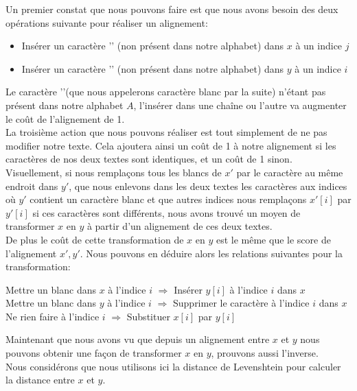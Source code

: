 \documentclass{article}
\begin{document}
Un premier constat que nous pouvons faire est que nous avons besoin des deux
opérations suivante pour réaliser un alignement:
\begin{itemize}
	\item Insérer un caractère '\textvisiblespace' (non présent dans notre
		alphabet) dans $x$ à un indice $j$
	\item Insérer un caractère '\textvisiblespace' (non présent dans notre
		alphabet) dans $y$ à un indice $i$
\end{itemize}

Le caractère '\textvisiblespace'(que nous appelerons caractère blanc par la
suite) n'étant pas présent dans notre alphabet $A$, l'insérer dans une chaîne
ou l'autre va augmenter le coût de l'alignement de 1.\\

La troisième action que nous pouvons réaliser est tout simplement de ne pas
modifier notre texte. Cela ajoutera ainsi un coût de 1 à notre alignement si
les caractères de nos deux textes sont identiques, et un coût de 1 sinon.\\

Visuellement, si nous remplaçons tous les blancs de $x'$ par le caractère au
même endroit dans $y'$, que nous enlevons dans les deux textes les caractères
aux indices où $y'$ contient un caractère blanc et que autres indices nous
remplaçons $x'[i]$ par $y'[i]$ si ces caractères sont différents, nous avons
trouvé un moyen de transformer $x$ en $y$ à partir d'un alignement de ces deux
textes.\\
De plus le coût de cette transformation de $x$ en $y$ est le même que le score de
l'alignement $x', y'$.
Nous pouvons en déduire alors les relations suivantes pour la transformation:

\begin{center}
	Mettre un blanc dans $x$ à l'indice $i$ $\Rightarrow$ Insérer $y[i]$ à
	l'indice $i$ dans $x$ \\
	Mettre un blanc dans $y$ à l'indice $i$ $\Rightarrow$ Supprimer le
	caractère à l'indice $i$ dans $x$ \\
	Ne rien faire à l'indice $i$ $\Rightarrow$ Substituer $x[i]$ par $y[i]$
\end{center}

Maintenant que nous avons vu que depuis un alignement entre $x$ et $y$ nous pouvons
obtenir une façon de transformer $x$ en $y$, prouvons aussi l'inverse.\\

Nous considérons que nous utilisons ici la distance de Levenshtein pour
calculer la distance entre $x$ et $y$.\\
\end{document}
